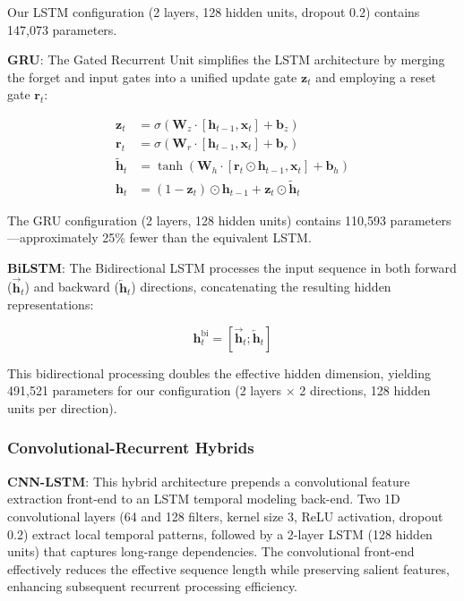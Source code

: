 \documentclass[conference]{IEEEtran}
\begin{document}
Our LSTM configuration (2 layers, 128 hidden units, dropout 0.2) contains 147,073 parameters.

\textbf{GRU}: The Gated Recurrent Unit \cite{cho2014} simplifies the LSTM architecture by merging the forget and input gates into a unified update gate $\mathbf{z}_t$ and employing a reset gate $\mathbf{r}_t$:

\begin{align}
\mathbf{z}_t &= \sigma(\mathbf{W}_z \cdot [\mathbf{h}_{t-1}, \mathbf{x}_t] + \mathbf{b}_z)\\
\mathbf{r}_t &= \sigma(\mathbf{W}_r \cdot [\mathbf{h}_{t-1}, \mathbf{x}_t] + \mathbf{b}_r)\\
\tilde{\mathbf{h}}_t &= \tanh(\mathbf{W}_h \cdot [\mathbf{r}_t \odot \mathbf{h}_{t-1}, \mathbf{x}_t] + \mathbf{b}_h)\\
\mathbf{h}_t &= (1 - \mathbf{z}_t) \odot \mathbf{h}_{t-1} + \mathbf{z}_t \odot \tilde{\mathbf{h}}_t \label{eq:gru_h}
\end{align}

The GRU configuration (2 layers, 128 hidden units) contains 110,593 parameters---approximately 25\% fewer than the equivalent LSTM.

\textbf{BiLSTM}: The Bidirectional LSTM processes the input sequence in both forward ($\overrightarrow{\mathbf{h}}_t$) and backward ($\overleftarrow{\mathbf{h}}_t$) directions, concatenating the resulting hidden representations:

\begin{equation}
\mathbf{h}_t^{\text{bi}} = [\overrightarrow{\mathbf{h}}_t ; \overleftarrow{\mathbf{h}}_t]
\label{eq:bilstm}
\end{equation}

This bidirectional processing doubles the effective hidden dimension, yielding 491,521 parameters for our configuration (2 layers $\times$ 2 directions, 128 hidden units per direction).

\subsubsection{Convolutional-Recurrent Hybrids}

\textbf{CNN-LSTM}: This hybrid architecture prepends a convolutional feature extraction front-end to an LSTM temporal modeling back-end. Two 1D convolutional layers (64 and 128 filters, kernel size 3, ReLU activation, dropout 0.2) extract local temporal patterns, followed by a 2-layer LSTM (128 hidden units) that captures long-range dependencies. The convolutional front-end effectively reduces the effective sequence length while preserving salient features, enhancing subsequent recurrent processing efficiency.
\end{document}

